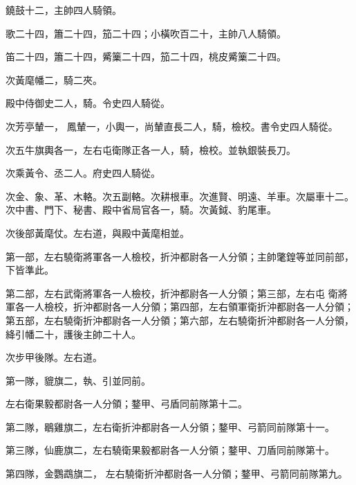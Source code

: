 \begin{pinyinscope}
 鐃鼓十二，主帥四人騎領。



 歌二十四，簫二十四，笳二十四；小橫吹百二十，主帥八人騎領。



 笛二十四，簫二十四，觱篥二十四，笳二十四，桃皮觱篥二十四。



 次黃麾幡二，騎二夾。



 殿中侍御史二人，騎。令史四人騎從。



 次芳亭輦一，
 鳳輦一，小輿一，尚輦直長二人，騎，檢校。書令史四人騎從。



 次五牛旗輿各一，左右屯衛隊正各一人，騎，檢校。並執銀裝長刀。



 次乘黃令、丞二人。府史四人騎從。



 次金、象、革、木輅。次五副輅。次耕根車。次進賢、明遠、羊車。次屬車十二。次中書、門下、秘書、殿中省局官各一，騎。次黃鉞、豹尾車。



 次後部黃麾仗。左右道，與殿中黃麾相並。



 第一部，左右驍衛將軍各一人檢校，折沖都尉各一人分領；主帥氅鍠等並同前部，下皆準此。



 第二部，左右武衛將軍各一人檢校，折沖都尉各一人分領；第三部，左右屯
 衛將軍各一人檢校，折沖都尉各一人分領；第四部，左右領軍衛折沖都尉各一人分領；第五部，左右驍衛折沖都尉各一人分領；第六部，左右驍衛折沖都尉各一人分領，絳引幡二十，護後主帥二十人。



 次步甲後隊。左右道。



 第一隊，貔旗二，執、引並同前。



 左右衛果毅都尉各一人分領；鍪甲、弓盾同前隊第十二。



 第二隊，鶡雞旗二，左右衛折沖都尉各一人分領；鍪甲、弓箭同前隊第十一。



 第三隊，仙鹿旗二，左右驍衛果毅都尉各一人分領；鍪甲、刀盾同前隊第十。



 第四隊，金鸚鵡旗二，
 左右驍衛折沖都尉各一人分領；鍪甲、弓箭同前隊第九。




\end{pinyinscope}
